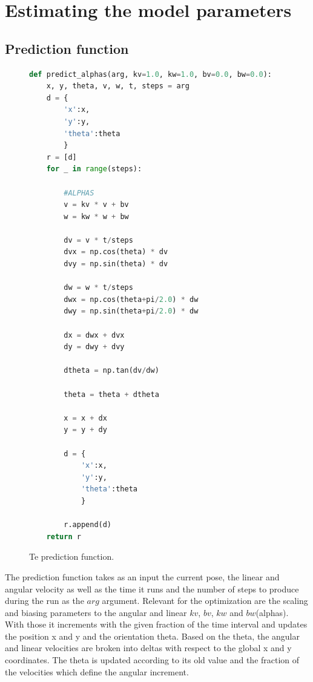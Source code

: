 \documentclass{scrartcl}
\begin{document}
\section{Estimating the model parameters }

\subsection{Prediction function}
\begin{figure}[H]
\begin{lstlisting}[language=Python]
def predict_alphas(arg, kv=1.0, kw=1.0, bv=0.0, bw=0.0):
    x, y, theta, v, w, t, steps = arg
    d = {
        'x':x,
        'y':y,
        'theta':theta
        }
    r = [d]
    for _ in range(steps):

        #ALPHAS
        v = kv * v + bv
        w = kw * w + bw

        dv = v * t/steps
        dvx = np.cos(theta) * dv
        dvy = np.sin(theta) * dv

        dw = w * t/steps
        dwx = np.cos(theta+pi/2.0) * dw
        dwy = np.sin(theta+pi/2.0) * dw

        dx = dwx + dvx
        dy = dwy + dvy

        dtheta = np.tan(dv/dw)

        theta = theta + dtheta

        x = x + dx
        y = y + dy

        d = {
            'x':x,
            'y':y,
            'theta':theta
            }

        r.append(d)
    return r
\end{lstlisting}

\caption{Te prediction function.}
\label{fig:prediction}
\end{figure}

The prediction function takes as an input the current pose, the linear and angular velocity as well as the time it runs and the number of steps to produce during the run as the $arg$ argument. Relevant for the optimization are the scaling and biasing parameters to the angular and linear $kv$, $bv$, $kw$   and  $bw$(alphas). With those it increments with the given fraction of the time interval and updates the position x and y and the orientation theta. Based on the theta, the angular and linear velocities are broken into deltas with respect to the global x and y coordinates. The theta is updated according to its old value and the fraction of the velocities which define the angular increment.\\
\end{document}
